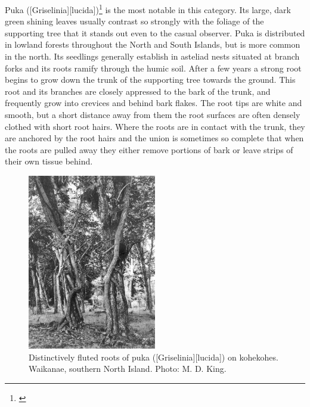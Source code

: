 Puka ([Griselinia][lucida])\footnote{\cite{dawson1966vegetative}} is the most notable in this category.
Its large, dark green shining leaves usually contrast so strongly with the foliage of the supporting tree that it stands out even to the casual observer.
Puka is distributed in lowland forests throughout the North and South Islands, but is more common in the north.
Its seedlings generally establish in asteliad nests situated at branch forks and its roots ramify through the humic soil.
After a few years a strong root begins to grow down the trunk of the supporting tree towards the ground.
This root and its branches are closely appressed to the bark of the trunk, and frequently grow into crevices and behind bark flakes.
The root tips are white and smooth, but a short distance away from them the root surfaces are often densely clothed with short root hairs.
Where the roots are in contact with the trunk, they are anchored by the root hairs and the union is sometimes so complete that when the roots are pulled away they either remove portions of bark or leave strips of their own tissue behind.

\begin{figure}
	\includegraphics[width=0.5\textwidth]{graphics/figure46puka-roots.jpg}
	\centering
	\caption[Distinctively fluted roots of puka on kohekohes]{Distinctively fluted roots of puka ([Griselinia][lucida]) on kohekohes.
	Waikanae, southern North Island.
	Photo: M. D. King.}%
	\label{fig:46puka-roots}
\end{figure}

